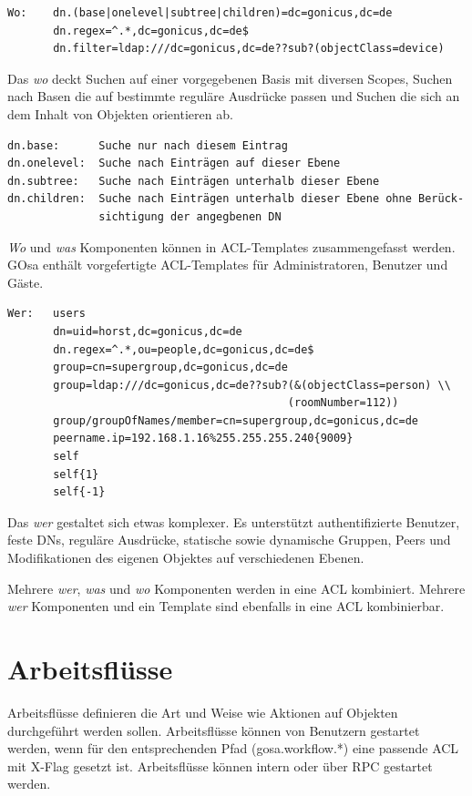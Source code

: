 \begin{verbatim}
Wo:    dn.(base|onelevel|subtree|children)=dc=gonicus,dc=de
       dn.regex=^.*,dc=gonicus,dc=de$
       dn.filter=ldap:///dc=gonicus,dc=de??sub?(objectClass=device)
\end{verbatim}

Das \textit{wo} deckt Suchen auf einer vorgegebenen Basis mit diversen
Scopes, Suchen nach Basen die auf bestimmte reguläre Ausdrücke passen
und Suchen die sich an dem Inhalt von Objekten orientieren ab.

\begin{verbatim}
dn.base:      Suche nur nach diesem Eintrag
dn.onelevel:  Suche nach Einträgen auf dieser Ebene
dn.subtree:   Suche nach Einträgen unterhalb dieser Ebene
dn.children:  Suche nach Einträgen unterhalb dieser Ebene ohne Berück-
              sichtigung der angegbenen DN
\end{verbatim}

\textit{Wo} und \textit{was} Komponenten können in ACL-Templates zusammengefasst
werden. GOsa enthält vorgefertigte ACL-Templates für Administratoren, Benutzer und
Gäste.

\begin{verbatim}
Wer:   users
       dn=uid=horst,dc=gonicus,dc=de
       dn.regex=^.*,ou=people,dc=gonicus,dc=de$
       group=cn=supergroup,dc=gonicus,dc=de
       group=ldap:///dc=gonicus,dc=de??sub?(&(objectClass=person) \\
                                           (roomNumber=112))
       group/groupOfNames/member=cn=supergroup,dc=gonicus,dc=de
       peername.ip=192.168.1.16%255.255.255.240{9009}
       self
       self{1}
       self{-1}
\end{verbatim}

Das \textit{wer} gestaltet sich etwas komplexer. Es unterstützt authentifizierte
Benutzer, feste DNs, reguläre Ausdrücke, statische sowie dynamische Gruppen,
Peers und Modifikationen des eigenen Objektes auf verschiedenen Ebenen.

Mehrere \textit{wer}, \textit{was} und \textit{wo} Komponenten werden in eine 
ACL kombiniert. Mehrere \textit{wer} Komponenten und ein Template sind ebenfalls
in eine ACL kombinierbar.


\section{Arbeitsflüsse}

Arbeitsflüsse definieren die Art und Weise wie Aktionen auf Objekten
durchgeführt werden sollen. Arbeitsflüsse können von Benutzern gestartet
werden, wenn für den entsprechenden Pfad (gosa.workflow.*) eine passende
ACL mit X-Flag gesetzt ist. Arbeitsflüsse können intern oder über RPC
gestartet werden.

